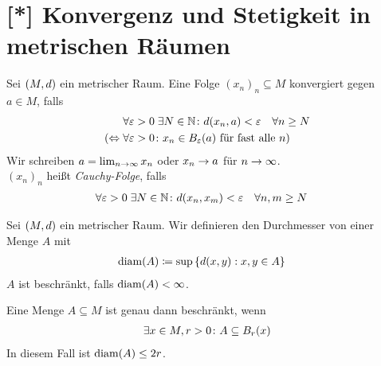 \section{[*] Konvergenz und Stetigkeit in metrischen Räumen}
\thispagestyle{pagenumberonly}

\begin{definition}
    Sei $\left(M, d\right)$ ein metrischer Raum. Eine Folge $(x_n)_n \subseteq M$ konvergiert gegen $a \in M$, falls
    \begin{align*}
        &\forall\varepsilon > 0\ex N\in\N\colon d\of{x_n, a} < \varepsilon\quad\forall n\geq N\\
        (\equivalent &\forall \varepsilon > 0\colon x_n \in B_{\varepsilon}\of{a} \text{ für fast alle } n)
    \end{align*}
    Wir schreiben $a = \lim_{n\rightarrow{}\infty} x_n$ oder $x_n\rightarrow{} a$ für $n\rightarrow{}\infty$.\\
    $(x_n)_n$ heißt \emph{Cauchy-Folge}, falls
    \begin{align*}
        &\forall\varepsilon>0\ex N\in\N\colon d\of{x_n, x_m} < \varepsilon\quad\forall n,m\geq N
    \end{align*}
\end{definition}

\begin{definition}[Durchmesser]
    Sei $\left(M, d\right)$ ein metrischer Raum. Wir definieren den Durchmesser von einer Menge $A$ mit
    \begin{align*}
        \diam\of{A} &\coloneqq \sup \set{d\of{x,y}: x,y\in A}
    \end{align*}
    $A$ ist beschränkt, falls $\diam\of{A} < \infty$.
\end{definition}

\begin{bemerkung}
    Eine Menge $A\subseteq M$ ist genau dann beschränkt, wenn
    \begin{align*}
        \exists x\in M, r> 0\colon A \subseteq B_r\of{x}
    \end{align*}
    In diesem Fall ist $\diam\of{A} \leq 2r$.
\end{bemerkung}

